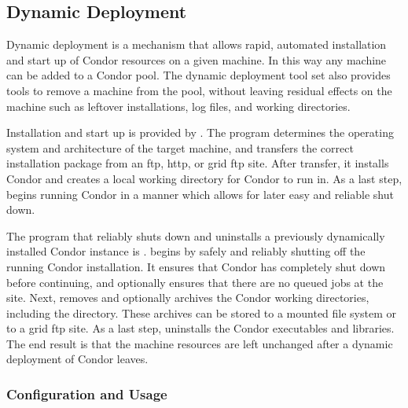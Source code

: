 \subsection{\label{sec:Dynamic-Deployment}Dynamic Deployment}

Dynamic deployment is a mechanism that allows rapid, automated
installation and start up of Condor resources on a given machine.
In this way any machine can be added to a Condor pool.
The dynamic
deployment tool set also provides tools to remove a machine from the
pool, without leaving residual effects on the machine such as leftover
installations, log files, and working directories.

Installation and start up is provided by .
The  program determines the operating system and
architecture of the target machine, and transfers the correct
installation package from an ftp, http, or grid ftp site.
After transfer, it
installs Condor and creates a local working
directory for Condor to run in.  As a last step, 
begins running Condor in a manner which allows for later easy and reliable
shut down.

The program that reliably shuts down and uninstalls a previously
dynamically installed Condor instance is .
 begins by safely and reliably shutting off the
running Condor installation.  It ensures that Condor has
completely shut down before continuing, and optionally ensures that
there are no queued jobs at the site.
Next, 
removes and optionally archives the Condor working directories,
including the  directory. 
These archives can be stored to a
mounted file system or to a grid ftp site.
As a last step,
 uninstalls the Condor executables and libraries.
The end result is that the machine resources are left unchanged after
a dynamic deployment of Condor leaves.

\subsubsection{Configuration and Usage}


